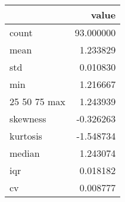\begin{tabular}{lr}
\toprule
 & value \\
\midrule
count & 93.000000 \\
mean & 1.233829 \\
std & 0.010830 \\
min & 1.216667 \\
25%
50%
75%
max & 1.243939 \\
skewness & -0.326263 \\
kurtosis & -1.548734 \\
median & 1.243074 \\
iqr & 0.018182 \\
cv & 0.008777 \\
\bottomrule
\end{tabular}
